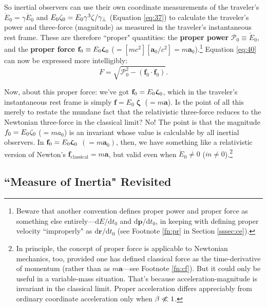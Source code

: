 \documentclass[12pt]{article}
\renewcommand{\vv}[1]{\mathbf{#1}}
\newcommand{\dd}[1]{\mathrm{d}#1}
\newcommand{\vvzeta}{\bm{\upzeta}}
\begin{document}
So inertial observers can use their own coordinate measurements of the traveler's $\mathring{E}_0 = \gamma \dot{E}_0$ and $E_0 \mkern.5mu \zeta_0 = E_0 \gamma^3 \zeta / \gamma_{\perp}$ (Equation \ref{eq:37}) to calculate the traveler's power and three-force (magnitude) as measured in the traveler's instantaneous rest frame. These are therefore ``proper" quantities: the \textbf{proper power} $\mathcal{P}_0 \equiv \mathring{E}_0$, and the \textbf{proper force} $\vv f_0 \equiv E_0 \vvzeta_{\mkern1mu 0}$ ($= [mc^2][\vv a_0 / c^2] = m \vv a_0$).\footnote{Beware that another convention defines proper power and proper force as something else entirely---$\dd E / \dd t_0$ and $\dd \vv p / \dd t_0$, in keeping with defining proper velocity ``improperly" as $\dd \vv r / \dd t_0$ (see Footnote \ref{fn:pr} in Section \ref{sssec:ce}).} Equation \ref{eq:40} can now be expressed more intelligibly:
\begin{equation}\label{eq:42}
F = \sqrt{\mathcal{P}_0^2 - (\vv f_0 \cdot \vv f_0)} .
\end{equation}

Now, about this proper force: we've got $\vv f_0 = E_0 \vvzeta_{\mkern1mu 0}$, which in the traveler's instantaneous rest frame is simply $\vv f = E_0 \vvzeta$ ($= m \vv a$). Is the point of all this merely to restate the mundane fact that the relativistic three-force reduces to the Newtonian three-force in the classical limit? No! The point is that the magnitude $f_0 = E_0 \mkern.5mu \zeta_0$ ($= m a_0$) is an invariant whose value is calculable by all inertial observers. In $\vv f_0 = E_0 \vvzeta_{\mkern1mu 0}$ $(= m \vv a_0)$, then, we have something like a relativistic version of Newton's $\vv f_{\mathrm{classical}} = m \vv a$, but valid even when $\dot{E}_0 \neq 0$ ($\dot{m} \neq 0$).\footnote{In principle, the concept of proper force is applicable to Newtonian mechanics, too, provided one has defined classical force as the time-derivative of momentum (rather than as $m \vv a$---see Footnote \ref{fn:cf}). But it could only be useful in a variable-mass situation. That's because acceleration-magnitude is invariant in the classical limit. Proper acceleration differs appreciably from ordinary coordinate acceleration only when $\beta \centernot{\ll} 1$.}


\subsection["Measure of Inertia" Revisited]{``Measure of Inertia" Revisited}\label{ssec:in}
\end{document}
